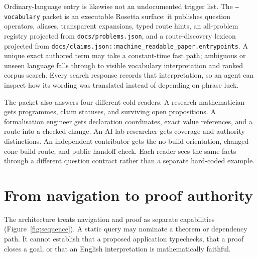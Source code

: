 \documentclass[11pt]{article}
\begin{document}
Ordinary-language entry is likewise not an undocumented trigger list. The
\texttt{--vocabulary} packet is an executable Rosetta surface: it publishes
question operators, aliases, transparent expansions, typed route hints, an
all-problem registry projected from \texttt{docs/problems.json}, and a
route-discovery lexicon projected from
\texttt{docs/claims.json::machine\_readable\_paper.entrypoints}. A unique exact
authored term may take a constant-time fast path; ambiguous or unseen language
falls through to visible vocabulary interpretation and ranked corpus search.
Every search response records that interpretation, so an agent can inspect how
its wording was translated instead of depending on phrase luck.

The packet also answers four different cold readers. A research mathematician
gets programmes, claim statuses, and surviving open propositions. A
formalisation engineer gets declaration coordinates, exact value references,
and a route into a checked change. An AI-lab researcher gets coverage and
authority distinctions. An independent contributor gets the no-build
orientation, changed-cone build route, and public handoff check. Each reader
sees the same facts through a different question contract rather than a
separate hard-coded example.

\section{From navigation to proof authority}\label{sec:authority}

The architecture treats navigation and proof as separate capabilities
(Figure~\ref{fig:sequence}). A static query may nominate a theorem or dependency
path. It cannot establish that a proposed application typechecks, that a proof
closes a goal, or that an English interpretation is mathematically faithful.
\end{document}
